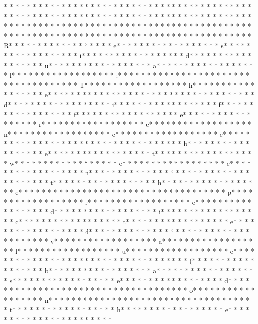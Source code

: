 * * *  * * *  * * *  *  * * *  *  * * *  * * *  * * *  *  * * *  *  * * *  * * *  * * *  *  * * *  *  * * *  *  * * *  * * *  * * *  *  * * *  *  * * *  *  * * *  * * *  * * *  *  * * *  *  * * *  *  * * *  * * *  * * *  *  * * *  *  * * *  *  * * *  * * *  * * *  *  * * *  *  * * *  *  * * *  * * *  * * *  *  * * *  *  * * *  *  * * *  * * *  * * *  *  * * *  *  * * *  *  * * *  * * *  * * *  *  * * *  *  * * *  * R* * *  * * *  * * *  *  * * *  *  * * *  * e* * *  * * *  * * *  *  * * *  *  * * *  * s* * *  * * *  * * *  *  * * *  *  * * *  * i* * *  * * *  * * *  *  * * *  *  * * *  * d* * *  * * *  * * *  *  * * *  *  * * *  * u* * *  * * *  * * *  *  * * *  *  * * *  * a* * *  * * *  * * *  *  * * *  *  * * *  * l* * *  * * *  * * *  *  * * *  *  * * *  * :* * *  * * *  * * *  *  * * *  *  * * *  *  * * *  * * *  * * *  *  * * *  *  * * *  * T* * *  * * *  * * *  *  * * *  *  * * *  * h* * *  * * *  * * *  *  * * *  *  * * *  * e* * *  * * *  * * *  *  * * *  *  * * *  *  * * *  * * *  * * *  *  * * *  *  * * *  * d* * *  * * *  * * *  *  * * *  *  * * *  * i* * *  * * *  * * *  *  * * *  *  * * *  * f* * *  * * *  * * *  *  * * *  *  * * *  * f* * *  * * *  * * *  *  * * *  *  * * *  * e* * *  * * *  * * *  *  * * *  *  * * *  * r* * *  * * *  * * *  *  * * *  *  * * *  * e* * *  * * *  * * *  *  * * *  *  * * *  * n* * *  * * *  * * *  *  * * *  *  * * *  * c* * *  * * *  * * *  *  * * *  *  * * *  * e* * *  * * *  * * *  *  * * *  *  * * *  *  * * *  * * *  * * *  *  * * *  *  * * *  * b* * *  * * *  * * *  *  * * *  *  * * *  * e* * *  * * *  * * *  *  * * *  *  * * *  * t* * *  * * *  * * *  *  * * *  *  * * *  * w* * *  * * *  * * *  *  * * *  *  * * *  * e* * *  * * *  * * *  *  * * *  *  * * *  * e* * *  * * *  * * *  *  * * *  *  * * *  * n* * *  * * *  * * *  *  * * *  *  * * *  *  * * *  * * *  * * *  *  * * *  *  * * *  * t* * *  * * *  * * *  *  * * *  *  * * *  * h* * *  * * *  * * *  *  * * *  *  * * *  * e* * *  * * *  * * *  *  * * *  *  * * *  *  * * *  * * *  * * *  *  * * *  *  * * *  * p* * *  * * *  * * *  *  * * *  *  * * *  * r* * *  * * *  * * *  *  * * *  *  * * *  * e* * *  * * *  * * *  *  * * *  *  * * *  * d* * *  * * *  * * *  *  * * *  *  * * *  * i* * *  * * *  * * *  *  * * *  *  * * *  * c* * *  * * *  * * *  *  * * *  *  * * *  * t* * *  * * *  * * *  *  * * *  *  * * *  * e* * *  * * *  * * *  *  * * *  *  * * *  * d* * *  * * *  * * *  *  * * *  *  * * *  *  * * *  * * *  * * *  *  * * *  *  * * *  * v* * *  * * *  * * *  *  * * *  *  * * *  * a* * *  * * *  * * *  *  * * *  *  * * *  * l* * *  * * *  * * *  *  * * *  *  * * *  * u* * *  * * *  * * *  *  * * *  *  * * *  * e* * *  * * *  * * *  *  * * *  *  * * *  *  * * *  * * *  * * *  *  * * *  *  * * *  * (* * *  * * *  * * *  *  * * *  *  * * *  * b* * *  * * *  * * *  *  * * *  *  * * *  * a* * *  * * *  * * *  *  * * *  *  * * *  * s* * *  * * *  * * *  *  * * *  *  * * *  * e* * *  * * *  * * *  *  * * *  *  * * *  * d* * *  * * *  * * *  *  * * *  *  * * *  *  * * *  * * *  * * *  *  * * *  *  * * *  * o* * *  * * *  * * *  *  * * *  *  * * *  * n* * *  * * *  * * *  *  * * *  *  * * *  *  * * *  * * *  * * *  *  * * *  *  * * *  * t* * *  * * *  * * *  *  * * *  *  * * *  * h* * *  * * *  * * *  *  * * *  *  * * *  * e* * *  * * *  * * *  *  * * *  *  * * *  *  * * *  * * 